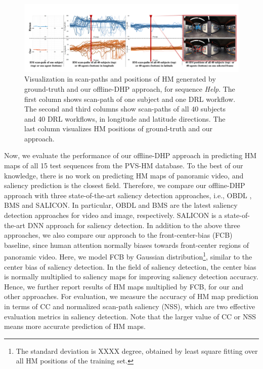 \documentclass[10pt,journal,compsoc]{IEEEtran}
\begin{document}
\begin{figure}
	\begin{center}
		\centerline{\includegraphics[width=2\columnwidth]{figures/experiment/scanpath_objective_result}}%
		\caption{\footnotesize{Visualization in scan-paths and positions of HM generated by ground-truth and our offline-DHP approach, for sequence \textit{Help}. The first column shows scan-path of one subject and one DRL workflow. The second and third columns show scan-paths of all 40 subjects and 40 DRL workflows, in longitude and latitude directions. The last column visualizes HM positions of ground-truth and our approach.}}
		\label{scan-path-example}
	\end{center}
\end{figure}

Now, we evaluate the performance of our offline-DHP approach in predicting HM maps of all 15 test sequences from the PVS-HM database. To the best of our knowledge, there is no work on predicting HM maps of panoramic video, and saliency prediction is the closest field. Therefore, we compare our offline-DHP approach with three state-of-the-art saliency detection approaches, i.e.,  OBDL  \cite{hossein2015many}, BMS \cite{zhang2016exploiting} and SALICON\cite{huang2015salicon}.
In particular, OBDL  \cite{hossein2015many} and BMS \cite{zhang2016exploiting} are the latest saliency detection approaches for video and image, respectively.
SALICON\cite{huang2015salicon} is a state-of-the-art DNN approach for saliency detection.
In addition to the above three approaches, we also compare our approach to the front-center-bias (FCB) baseline, since human attention normally biases towards front-center regions of panoramic video.
Here, we model FCB by Gaussian distribution\footnote{The standard deviation is XXXX degree, obtained by least square fitting over all HM positions of the training set.}, similar to the center bias of saliency detection.
In the field of saliency detection, the center bias  \cite{borji2013state} is normally multiplied to saliency maps for improving saliency detection accuracy. Hence, we further report results of HM maps multiplied by FCB, for our and other approaches.
For evaluation, we measure the accuracy of HM map prediction in terms of CC and normalized scan-path saliency (NSS), which are two effective evaluation metrics \cite{Li_2015_ICCV} in saliency detection.
Note that the larger value of CC or NSS means more accurate prediction of HM maps.
\end{document}

